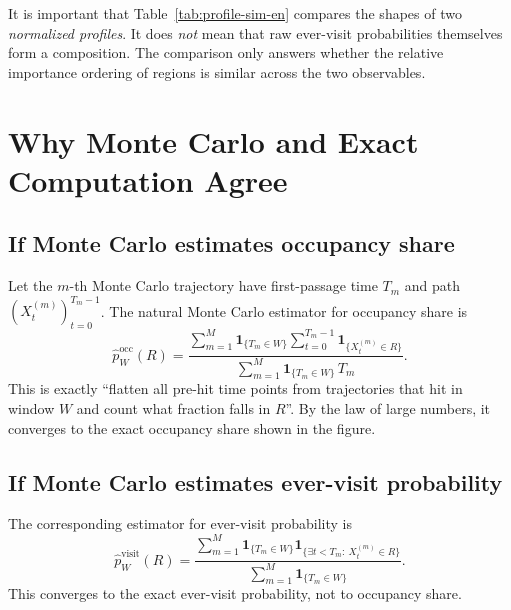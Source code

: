 \documentclass[11pt]{article}
\begin{document}
\begin{table}[!htbp]
  \centering
  \footnotesize
  
  \caption{Exact comparison between occupancy share and ever-visit probability across the three windows.}
  \label{tab:measure-compare-en}
\end{table}

\begin{table}[!htbp]
  \centering
  \footnotesize
  
  \caption{Similarity between the two normalized profiles on the same five-region basis. A cosine similarity closer to $1$ means the shapes are more alike; a smaller total-variation distance means they are closer in mass distribution.}
  \label{tab:profile-sim-en}
\end{table}

It is important that Table~\ref{tab:profile-sim-en} compares the shapes of two \emph{normalized profiles}. It does \emph{not} mean that raw ever-visit probabilities themselves form a composition. The comparison only answers whether the relative importance ordering of regions is similar across the two observables.

\section{Why Monte Carlo and Exact Computation Agree}
\subsection{If Monte Carlo estimates occupancy share}
Let the $m$-th Monte Carlo trajectory have first-passage time $T_m$ and path $(X_t^{(m)})_{t=0}^{T_m-1}$. The natural Monte Carlo estimator for occupancy share is
\[
\widehat p^{\mathrm{occ}}_W(R)
=
\frac{
\sum_{m=1}^M
\mathbf{1}_{\{T_m\in W\}}
\sum_{t=0}^{T_m-1}\mathbf{1}_{\{X_t^{(m)}\in R\}}
}{
\sum_{m=1}^M
\mathbf{1}_{\{T_m\in W\}}\,T_m
}.
\]
This is exactly ``flatten all pre-hit time points from trajectories that hit in window $W$ and count what fraction falls in $R$''. By the law of large numbers, it converges to the exact occupancy share shown in the figure.

\subsection{If Monte Carlo estimates ever-visit probability}
The corresponding estimator for ever-visit probability is
\[
\widehat p^{\mathrm{visit}}_W(R)
=
\frac{
\sum_{m=1}^M
\mathbf{1}_{\{T_m\in W\}}
\mathbf{1}_{\{\exists t<T_m:\ X_t^{(m)}\in R\}}
}{
\sum_{m=1}^M
\mathbf{1}_{\{T_m\in W\}}
}.
\]
This converges to the exact ever-visit probability, not to occupancy share.
\end{document}
